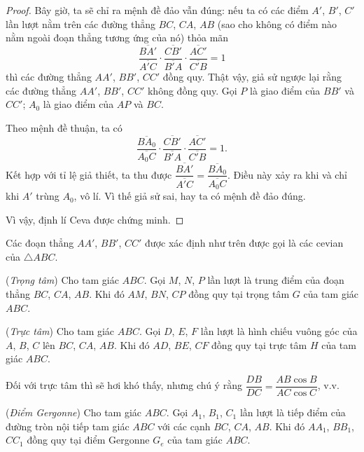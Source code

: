 \documentclass{article} %
\begin{document}
\begin{proof}
            Bây giờ, ta sẽ chỉ ra mệnh đề đảo vẫn đúng: nếu ta có các điểm \(A'\), \(B'\), \(C'\) lần lượt nằm trên các đường thẳng \(BC\), \(CA\), \(AB\) (sao cho không có điểm nào nằm ngoài đoạn thẳng tương ứng của nó) thỏa mãn
            \[\frac{\overline{BA'}}{\overline{A'C}} \cdot \frac{\overline{CB'}}{\overline{B'A}} \cdot \frac{\overline{AC'}}{\overline{C'B}} = 1\]
            thì các đường thẳng \(AA'\), \(BB'\), \(CC'\) đồng quy. Thật vậy, giả sử ngược lại rằng các đường thẳng \(AA'\), \(BB'\), \(CC'\) không đồng quy. Gọi \(P\) là giao điểm của \(BB'\) và \(CC'\); \(A_0\) là giao điểm của \(AP\) và \(BC\).

            Theo mệnh đề thuận, ta có
            \[\frac{\overline{BA_0}}{\overline{A_0C}} \cdot \frac{\overline{CB'}}{\overline{B'A}} \cdot \frac{\overline{AC'}}{\overline{C'B}} = 1.\]
            Kết hợp với tỉ lệ giả thiết, ta thu được \(\dfrac{\overline{BA'}}{\overline{A'C}} = \dfrac{\overline{BA_0}}{\overline{A_0C}}\). Điều này xảy ra khi và chỉ khi \(A'\) trùng \(A_0\), vô lí. Vì thế giả sử sai, hay ta có mệnh đề đảo đúng.

            Vì vậy, định lí Ceva được chứng minh.
        \end{proof}

        \begin{definition}
            Các đoạn thẳng \(AA'\), \(BB'\), \(CC'\) được xác định như trên được gọi là các cevian của \(\triangle ABC\).
        \end{definition}

        \begin{corollary}
            (\textit{Trọng tâm}) Cho tam giác \(ABC\). Gọi \(M\), \(N\), \(P\) lần lượt là trung điểm của đoạn thẳng \(BC\), \(CA\), \(AB\). Khi đó \(AM\), \(BN\), \(CP\) đồng quy tại trọng tâm \(G\) của tam giác \(ABC\). 
        \end{corollary}

        \begin{corollary}
            (\textit{Trực tâm}) Cho tam giác \(ABC\). Gọi \(D\), \(E\), \(F\) lần lượt là hình chiếu vuông góc của \(A\), \(B\), \(C\) lên \(BC\), \(CA\), \(AB\). Khi đó \(AD\), \(BE\), \(CF\) đồng quy tại trực tâm \(H\) của tam giác \(ABC\). 
        \end{corollary}

        Đối với trực tâm thì sẽ hơi khó thấy, nhưng chú ý rằng \(\dfrac{DB}{DC} = \dfrac{AB \cos B}{AC \cos C}\), v.v.

        \begin{corollary}
            (\textit{Điểm Gergonne}) Cho tam giác \(ABC\). Gọi \(A_1\), \(B_1\), \(C_1\) lần lượt là tiếp điểm của đường tròn nội tiếp tam giác \(ABC\) với các cạnh \(BC\), \(CA\), \(AB\). Khi đó \(AA_1\), \(BB_1\), \(CC_1\) đồng quy tại điểm Gergonne \(G_e\) của tam giác \(ABC\). 
        \end{corollary}
\end{document}
